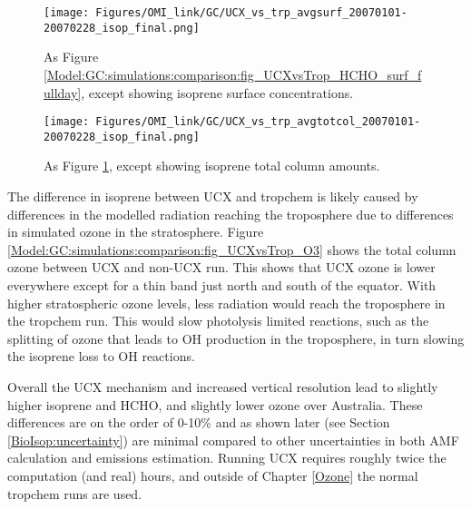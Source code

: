       \begin{figure}
        \texttt{[image: Figures/OMI\_link/GC/UCX\_vs\_trp\_avgsurf\_20070101-20070228\_isop\_final.png]}
        \caption{ %
          As Figure \ref{Model:GC:simulations:comparison:fig_UCXvsTrop_HCHO_surf_fullday}, except showing isoprene surface concentrations. 
        }      
        \label{Model:GC:simulations:comparison:fig_UCXvsTrop_isop_surf_fullday}
      \end{figure}
      \begin{figure}
        \texttt{[image: Figures/OMI\_link/GC/UCX\_vs\_trp\_avgtotcol\_20070101-20070228\_isop\_final.png]}
        \caption{ %
          As Figure \ref{Model:GC:simulations:comparison:fig_UCXvsTrop_isop_surf_fullday}, except showing isoprene total column amounts. 
        }      
        \label{Model:GC:simulations:comparison:fig_UCXvsTrop_isop_totcol_fullday}
      \end{figure}
      
      
      The difference in isoprene between UCX and tropchem is likely caused by differences in the modelled radiation reaching the troposphere due to differences in simulated ozone in the stratosphere.
      Figure \ref{Model:GC:simulations:comparison:fig_UCXvsTrop_O3} shows the total column ozone between UCX and non-UCX run.
      This shows that UCX ozone is lower everywhere except for a thin band just north and south of the equator.
      With higher stratospheric ozone levels, less radiation would reach the troposphere in the tropchem run.
      This would slow photolysis limited reactions, such as the splitting of ozone that leads to OH production in the troposphere, in turn slowing the isoprene loss to OH reactions.
      
      
      Overall the UCX mechanism and increased vertical resolution lead to slightly higher isoprene and HCHO, and slightly lower ozone over Australia.
      These differences are on the order of 0-10\% and as shown later (see Section \ref{BioIsop:uncertainty}) are minimal compared to other uncertainties in both AMF calculation and emissions estimation.
      Running UCX requires roughly twice the computation (and real) hours, and outside of Chapter \ref{Ozone} the normal tropchem runs are used.
      

